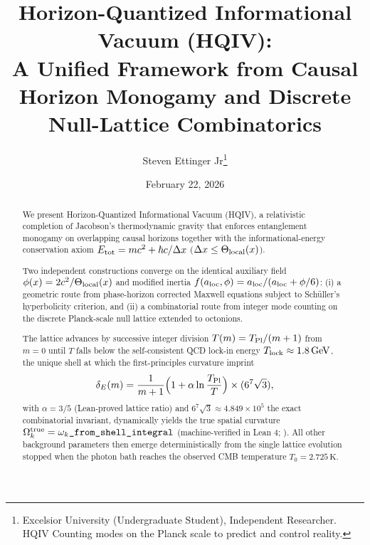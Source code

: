 \documentclass[12pt,a4paper]{article}
\title{Horizon-Quantized Informational Vacuum (HQIV): \\ A Unified Framework from Causal Horizon Monogamy and Discrete Null-Lattice Combinatorics}
\author{Steven Ettinger Jr\thanks{Excelsior University (Undergraduate Student), Independent Researcher. HQIV Counting modes on the Planck scale to predict and control reality.}}
\date{February 22, 2026}
\begin{document}
\sloppy

\maketitle

\begin{abstract}
    We present Horizon-Quantized Informational Vacuum (HQIV), a relativistic completion of Jacobson's thermodynamic gravity that enforces entanglement monogamy on overlapping causal horizons together with the informational-energy conservation axiom \(E_{\rm tot} = mc^2 + \hbar c / \Delta x\) (\(\Delta x \le \Theta_{\rm local}(x)\)).
    
    Two independent constructions converge on the identical auxiliary field \(\phi(x) = 2c^2 / \Theta_{\rm local}(x)\) and modified inertia \(f(a_{\rm loc},\phi) = a_{\rm loc}/(a_{\rm loc} + \phi/6)\): (i) a geometric route from phase-horizon corrected Maxwell equations subject to Schüller's hyperbolicity criterion, and (ii) a combinatorial route from integer mode counting on the discrete Planck-scale null lattice extended to octonions.
    
    The lattice advances by successive integer division \(T(m) = T_{\rm Pl}/(m+1)\) from \(m=0\) until \(T\) falls below the self-consistent QCD lock-in energy \(T_{\rm lock} \approx 1.8\,\text{GeV}\), the unique shell at which the first-principles curvature imprint
    \[
    \delta_E(m) = \frac{1}{m+1}\Bigl(1 + \alpha \ln\frac{T_{\rm Pl}}{T}\Bigr) \times (6^7\sqrt{3}),
    \]
    with \(\alpha = 3/5\) (Lean-proved lattice ratio) and \(6^7\sqrt{3} \approx 4.849 \times 10^5\) the exact combinatorial invariant, dynamically yields the true spatial curvature \(\Omega_k^{\rm true} = \omega_k\texttt{\_from\_shell\_integral}\) (machine-verified in Lean 4; \citep{hqiv-lean}). All other background parameters then emerge deterministically from the single lattice evolution stopped when the photon bath reaches the observed CMB temperature \(T_0 = 2.725\,\text{K}\).
    

\end{abstract}
\end{document}
